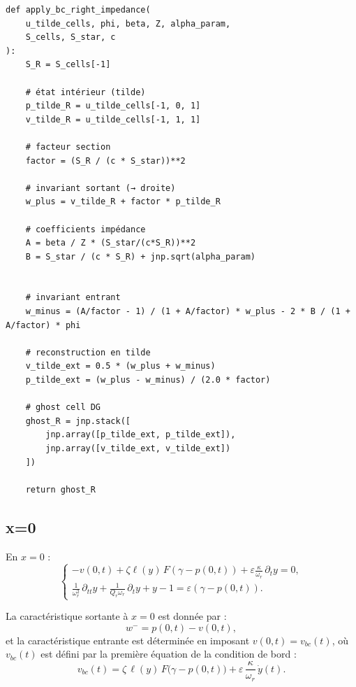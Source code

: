 \documentclass[12pt,a4paper]{article}
\begin{document}
\begin{verbatim}
def apply_bc_right_impedance(
    u_tilde_cells, phi, beta, Z, alpha_param,
    S_cells, S_star, c
):
    S_R = S_cells[-1]

    # état intérieur (tilde)
    p_tilde_R = u_tilde_cells[-1, 0, 1]
    v_tilde_R = u_tilde_cells[-1, 1, 1]

    # facteur section
    factor = (S_R / (c * S_star))**2

    # invariant sortant (→ droite)
    w_plus = v_tilde_R + factor * p_tilde_R

    # coefficients impédance
    A = beta / Z * (S_star/(c*S_R))**2
    B = S_star / (c * S_R) + jnp.sqrt(alpha_param)
    

    # invariant entrant
    w_minus = (A/factor - 1) / (1 + A/factor) * w_plus - 2 * B / (1 + A/factor) * phi

    # reconstruction en tilde
    v_tilde_ext = 0.5 * (w_plus + w_minus)
    p_tilde_ext = (w_plus - w_minus) / (2.0 * factor)

    # ghost cell DG
    ghost_R = jnp.stack([
        jnp.array([p_tilde_ext, p_tilde_ext]),
        jnp.array([v_tilde_ext, v_tilde_ext])
    ])

    return ghost_R
\end{verbatim}

\subsection{x=0}

En $x=0$ :
\begin{equation}
    \begin{cases}
    -v(0,t) + \zeta \ell(y)\,F(\gamma - p(0,t)) + \varepsilon\frac{\kappa}{\omega_r}\,\partial_t y = 0,
    \\[0.4em]
    \frac{1}{\omega_r^2}\,\partial_{tt} y + \frac{1}{Q_r\omega_r}\,\partial_t y + y - 1 = \varepsilon(\gamma - p(0,t)).
    \end{cases}
\end{equation}

La caractéristique sortante à $x=0$ est donnée par :
\begin{equation}
    w^- = p(0,t) - v(0,t),
\end{equation}
et la caractéristique entrante est déterminée en imposant $v(0,t) = v_{bc}(t)$,
où $v_{bc}(t)$ est défini par la première équation de la condition de bord :
\begin{equation}
    v_{bc}(t) = \zeta\,\ell(y)\,F\!\bigl(\gamma - p(0,t)\bigr)
    + \varepsilon\,\frac{\kappa}{\omega_r}\,\dot{y}(t).
\end{equation}
\end{document}
